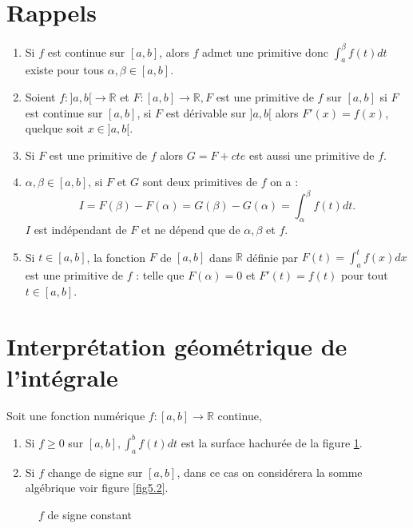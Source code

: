 \section{Rappels}
\begin{enumerate}
	\item Si \( f \) est continue sur \([a,b]\), alors \( f \) admet une primitive donc \(\displaystyle\int_{a}^{\beta} f(t) dt\) existe pour tous \( \alpha, \beta \in [a,b] \).
	\item Soient \( f : ]a, b[ \longrightarrow \mathbb{R} \) et \( F : [a,b] \longrightarrow \mathbb{R}, F \) est une primitive de \( f \) sur \([a,b]\) si \( F \) est continue sur \([a,b]\), si \( F \) est dérivable sur \( ]a, b[ \) alors \( F'(x) = f(x) \), quelque soit \( x \in ]a, b[ \).
	\item Si \( F \) est une primitive de \( f \) alors \( G = F + cte \) est aussi une primitive de \( f \).
	\item \( \alpha, \beta \in [a,b] \), si \( F \) et \( G \) sont deux primitives de \( f \) on a :
	\[
	I = F(\beta) - F(\alpha) = G(\beta) - G(\alpha) = \displaystyle\int_{\alpha}^{\beta} f(t) dt.
	\]
	\( I \) est indépendant de \( F \) et ne dépend que de \( \alpha, \beta \) et \( f \).
	\item Si \( t \in [a,b] \), la fonction \( F \) de \([a,b]\) dans \( \mathbb{R} \) définie par \( F(t) = \displaystyle\int_{a}^{t} f(x) dx \) est une primitive de \( f \) : telle que \( F(\alpha) = 0 \) et \( F'(t) = f(t) \) pour tout \( t \in [a,b] \).
\end{enumerate}

\section{Interprétation géométrique de l'intégrale}
Soit une fonction numérique \( f : [a,b] \longrightarrow \mathbb{R} \) continue,

\begin{enumerate}
	\item Si \( f \geq 0 \) sur \([a,b], \displaystyle\int_{a}^{b} f(t) dt \) est la surface hachurée de la figure \ref{fig5.1}.
	\item Si \( f \) change de signe sur \([a,b]\), dans ce cas on considérera la somme algébrique voir figure \ref{fig5.2}.
\end{enumerate}

\begin{figure}[H]
	\centering
	\caption{\( f \) de signe constant}
	\label{fig5.1}
\end{figure}

